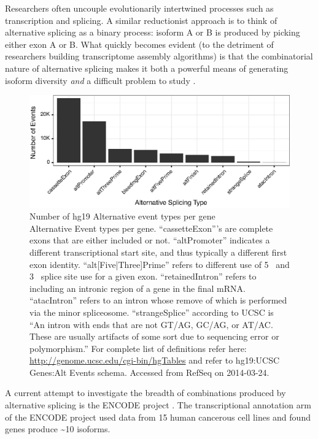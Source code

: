     Researchers often uncouple evolutionarily intertwined processes such as transcription and splicing. A similar reductionist approach is to think of alternative splicing as a binary process: isoform A or B is produced by picking either exon A or B. What quickly becomes evident (to the detriment of researchers building transcriptome assembly algorithms) is that the combinatorial nature of alternative splicing makes it both a powerful means of generating isoform diversity \textit{and} a difficult problem to study \citep{Trapnell2012a}.

    \begin{figure} %
      \centering 
      \includegraphics{Figures/Intro/ASEventTypesPlot.eps}
      \caption[Number of hg19 Alternative Event types]
      {
        Number of hg19 Alternative event types per gene\\[0.25cm]
        Alternative Event types per gene. ``cassetteExon'''s are complete exons that are either included or not. ``altPromoter'' indicates a different transcriptional start site, and thus typically a different first exon identity. ``alt[Five|Three]Prime'' refers to different use of 5\textprime~ and 3\textprime~ splice site use for a given exon. ``retainedIntron'' refers to including an intronic region of a gene in the final mRNA. ``atacIntron'' refers to an intron whose remove of which is performed via the minor spliceosome. ``strangeSplice'' according to UCSC is ``An intron with ends that are not GT/AG, GC/AG, or AT/AC. These are usually artifacts of some sort due to sequencing error or polymorphism.'' For complete list of definitions refer here: \url{http://genome.ucsc.edu/cgi-bin/hgTables} and refer to hg19:UCSC Genes:Alt Events schema. Accessed from RefSeq on 2014-03-24.
        }
      \label{Intro:fig:asEventsBarChart}
      \end{figure}

    A current attempt to investigate the breadth of combinations produced by alternative splicing is the ENCODE project \citep{Birney2007,Dunham2012}. The transcriptional annotation arm of the ENCODE project \citep{Djebali2012,Derrien2012} used data from 15 human cancerous cell lines and found genes produce \textasciitilde10 isoforms.

